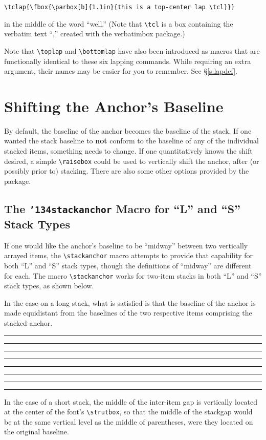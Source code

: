 \documentclass{article}
\def\rl{\rule[-.3pt]{2ex}{.6pt}}
\let\vb\verb
\newcommand\cmd[1]{\texttt{\char'134#1}}
\def\blmark{\rl\stackengine{-.9ex}{B}{\rule{.35ex}{0pt}L}{U}{l}{F}{T}{S}\rl}
\begin{document}
\vb|\tclap{\fbox{\parbox[b]{1.1in}{this is a top-center lap \tcl}}}|

in the middle of the word ``well.''  (Note that \vb|\tcl| is a box
containing the verbatim text ``\tcl,'' created with the
\textsf{verbatimbox} package.)

Note that \vb|\toplap| and \vb|\bottomlap| have also been introduced
as macros that are functionally identical to these six lapping commands.
While requiring an extra argument, their names may be easier for you to
remember.  See \S\ref{s:lapdef}.\vspace{-1ex}

\section{Shifting the Anchor's Baseline} 

By default, the baseline of the anchor becomes the baseline of the
stack.  If one wanted the stack baseline to \textbf{not} conform to
the baseline of any of the individual stacked items, something needs
to change.  If one quantitatively knows the shift desired, a simple
\vb|\raisebox| could be used to vertically shift the anchor, after
(or possibly prior to) stacking.  There are also some other options
provided by the package.

\subsection{The \cmd{stackanchor} Macro for ``L'' and ``S'' Stack Types%
\label{s:sa}}

If one would like the anchor's baseline to be ``midway'' between two
vertically arrayed items, the \vb|\stackanchor| macro attempts to
provide that capability for both ``L'' and ``S'' stack types, though the
definitions of ``midway'' are different for each.  The macro
\vb|\stackanchor| works for two-item stacks in both ``L'' and ``S''
stack types, as shown below.

In the case on a long stack, what is satisfied is that the baseline of
the anchor is made equidistant from the baselines of the two respective
items comprising the stacked anchor.

\def\stacktype{L}%

\Large
\def\stackalignment{r}%
%
\blmark%
\rl\rl
\stackanchor{\rl\rl\rl\rl top\rl}{\rl L-bottom\rl}%
\rl\rl%
\blmark
\normalsize

In the case of a short stack, the middle of the inter-item gap is
vertically located at the center of the font's \vb|\strutbox|, so that
the middle of the stackgap would be at the same vertical level as the
middle of parentheses, were they located on the original baseline.
\end{document}
